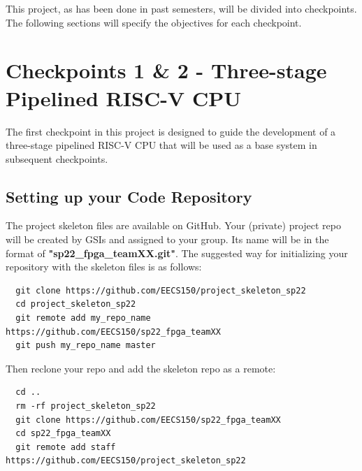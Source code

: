 \documentclass[11pt]{article}
\begin{document}
This project, as has been done in past semesters, will be divided into checkpoints. The following sections will specify the objectives for each checkpoint.

\newpage
\section{Checkpoints 1 \& 2 - Three-stage Pipelined RISC-V CPU}
The first checkpoint in this project is designed to guide the development of a three-stage pipelined RISC-V CPU that will be used as a base system in subsequent checkpoints.



\subsection{Setting up your Code Repository}
The project skeleton files are available on GitHub. Your (private) project repo will be created by GSIs and assigned to your group. Its name will be in the format of \textbf{"sp22\_fpga\_teamXX.git"}.
The suggested way for initializing your repository with the skeleton files is as follows:

\begin{verbatim}
  git clone https://github.com/EECS150/project_skeleton_sp22
  cd project_skeleton_sp22
  git remote add my_repo_name https://github.com/EECS150/sp22_fpga_teamXX
  git push my_repo_name master
\end{verbatim}


Then reclone your repo and add the skeleton repo as a remote:
\begin{verbatim}
  cd ..
  rm -rf project_skeleton_sp22
  git clone https://github.com/EECS150/sp22_fpga_teamXX
  cd sp22_fpga_teamXX
  git remote add staff https://github.com/EECS150/project_skeleton_sp22
\end{verbatim}
\end{document}
